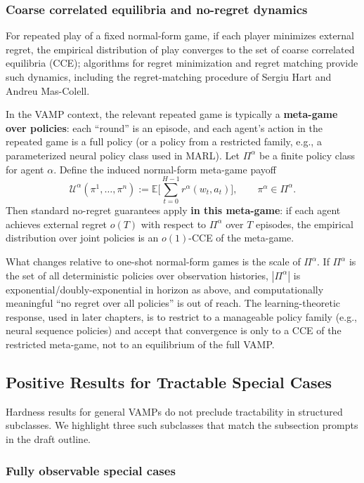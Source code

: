\subsubsection{Coarse correlated equilibria and no-regret dynamics}

For repeated play of a fixed normal-form game, if each player minimizes external regret, the empirical distribution of play converges to the set of coarse correlated equilibria (CCE); algorithms for regret minimization and regret matching provide such dynamics, including the regret-matching procedure of Sergiu Hart and Andreu Mas-Colell.

In the VAMP context, the relevant repeated game is typically a \textbf{meta-game over policies}: each ``round'' is an episode, and each agent's action in the repeated game is a full policy (or a policy from a restricted family, e.g., a parameterized neural policy class used in MARL). Let \(\Pi^\alpha\) be a finite policy class for agent \(\alpha\). Define the induced normal-form meta-game payoff
\[
\mathcal U^\alpha(\pi^1,\dots,\pi^n)
:= \mathbb E\Big[\sum_{t=0}^{H-1} r^\alpha(w_t,a_t)\Big],
\qquad \pi^\alpha\in\Pi^\alpha.
\]
Then standard no-regret guarantees apply \textbf{in this meta-game}: if each agent achieves external regret \(o(T)\) with respect to \(\Pi^\alpha\) over \(T\) episodes, the empirical distribution over joint policies is an \(o(1)\)-CCE of the meta-game.

What changes relative to one-shot normal-form games is the scale of \(\Pi^\alpha\). If \(\Pi^\alpha\) is the set of all deterministic policies over observation histories, \(|\Pi^\alpha|\) is exponential/doubly-exponential in horizon as above, and computationally meaningful ``no regret over all policies'' is out of reach. The learning-theoretic response, used in later chapters, is to restrict to a manageable policy family (e.g., neural sequence policies) and accept that convergence is only to a CCE of the restricted meta-game, not to an equilibrium of the full VAMP.

\subsection{Positive Results for Tractable Special Cases}

Hardness results for general VAMPs do not preclude tractability in structured subclasses. We highlight three such subclasses that match the subsection prompts in the draft outline.

\subsubsection{Fully observable special cases}

